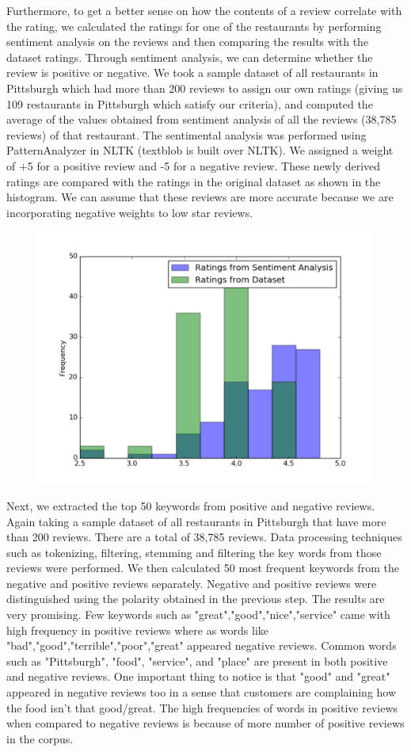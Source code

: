 \documentclass{neu_handout}
\begin{document}
Furthermore, to get a better sense on how the contents of a review correlate with the rating, we calculated the ratings for one of the restaurants by performing sentiment analysis on the reviews and then comparing the results with the dataset ratings. Through sentiment analysis, we can determine whether the review is positive or negative. We took a sample dataset of all restaurants in Pittsburgh which had more than 200 reviews to assign our own ratings (giving us 109 restaurants in Pittsburgh which satisfy our criteria), and computed the average of the values obtained from sentiment analysis of all the reviews (38,785 reviews) of that restaurant. The sentimental analysis was performed using PatternAnalyzer in NLTK (textblob is built over NLTK). We assigned a weight of +5 for a positive review and -5 for a negative review. These newly derived ratings are compared with the ratings in the original dataset as shown in the histogram. We can assume that these reviews are more accurate because we are incorporating negative weights to low star reviews.

\begin{figure}[h]
\centering
{
\includegraphics[width=0.4\linewidth]{sentimentanalysis}
}
\end{figure}

Next, we extracted the top 50 keywords from positive and negative reviews. Again taking a sample dataset of all restaurants in Pittsburgh that have more than 200 reviews. There are a total of 38,785 reviews. Data processing techniques such as tokenizing, filtering, stemming and filtering the key words from those reviews were performed. We then calculated 50 most frequent keywords from the negative and positive reviews separately. Negative and positive reviews were distinguished using the polarity obtained in the previous step.
The results are very promising. Few keywords such as "great","good","nice","service" came with high frequency in positive reviews where as words like "bad","good","terrible","poor","great" appeared negative reviews. Common words such as "Pittsburgh", "food", "service", and "place" are present in both positive and negative reviews. One important thing to notice is that "good" and "great" appeared in negative reviews too in a sense that customers are complaining how the food isn't that good/great. The high frequencies of words in positive reviews when compared to negative reviews is because of more number of positive reviews in the corpus.
\end{document}
